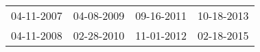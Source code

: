 \begin{supertabular}{llll}
 04-11-2007 &  04-08-2009 &  09-16-2011 &  10-18-2013 \\
 04-11-2008 &  02-28-2010 &  11-01-2012 &  02-18-2015 \\
\end{supertabular}
